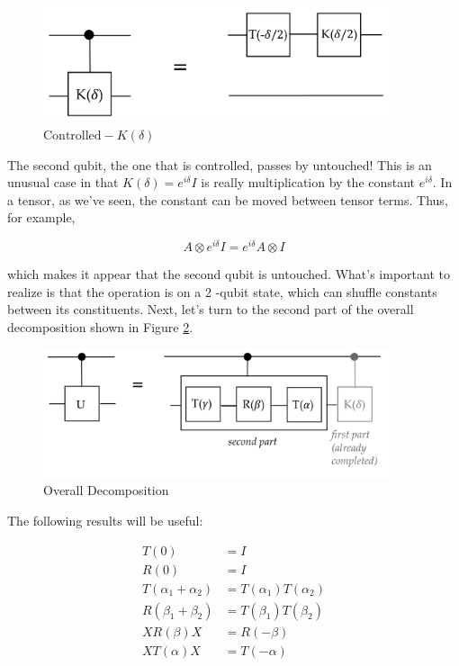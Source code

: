 \documentclass[main.tex]{subfiles}
\begin{document}
    \begin{figure}
        \centering
        \includegraphics[width=4in]{notes/figs/n09/05universal5.png}
        \caption{$\text{Controlled}-K(\delta)$}
        \label{fig:05universal5}
    \end{figure}
    
    The second qubit, the one that is controlled, passes by untouched! This is an unusual case in that $K(\delta)=e^{i \delta} I$ is really multiplication by the constant $e^{i \delta}$. In a tensor, as we've seen, the constant can be moved between tensor terms. Thus, for example,
    
    $$
    A \otimes e^{i \delta} I=e^{i \delta} A \otimes I
    $$
    
    which makes it appear that the second qubit is untouched. What's important to realize is that the operation is on a 2 -qubit state, which can shuffle constants between its constituents. Next, let's turn to the second part of the overall decomposition shown in Figure \ref{fig:06universal6}.
    
    \begin{figure}
        \centering
        \includegraphics[width=4in]{notes/figs/n09/06universal6.png}
        \caption{Overall Decomposition}
        \label{fig:06universal6}
    \end{figure}
    
    The following results will be useful:
    
    $$
    \begin{aligned}
    T(0) &=I \\
    R(0) &=I \\
    T\left(\alpha_{1}+\alpha_{2}\right) &=T\left(\alpha_{1}\right) T\left(\alpha_{2}\right) \\
    R\left(\beta_{1}+\beta_{2}\right) &=T\left(\beta_{1}\right) T\left(\beta_{2}\right) \\
    X R(\beta) X &=R(-\beta) \\
    X T(\alpha) X &=T(-\alpha)
    \end{aligned}
    $$
    
\end{document}

